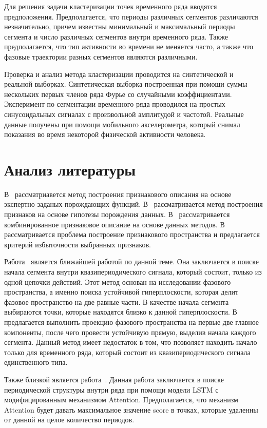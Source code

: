 \documentclass[12pt, twoside]{article}
\numberwithin{equation}{section}
\begin{document}
Для решения задачи кластеризации точек временного ряда вводятся предположения. 
Предполагается, что периоды различных сегментов различаются незначительно, причем известны минимальный и максимальный периоды сегмента и число различных сегментов внутри временного ряда. 
Также предполагается, что тип активности во времени не меняется часто, а также что фазовые траектории разных сегментов являются различными. 

Проверка и анализ метода кластеризации проводится на синтетической и реальной выборках. 
Синтетическая выборка построенная при помощи суммы нескольких первых членов ряда Фурье со случайными коэффициентами. 
Эксперимент по сегментации временного ряда проводился на простых синусоидальных сигналах с произвольной амплитудой и частотой. 
Реальные данные получены при помощи мобильного акселерометра, который снимал показания во время некоторой физической активности человека. 

\section{Анализ литературы}
В~\cite{kwapisz2010} рассматриавется метод построения признакового описания на основе экспертно заданых порождающих функций.
В~\cite{lukashin2003} рассматривается метод построения признаков на основе гипотезы порождения данных. 
В~\cite{Ivkin2015} рассматривается комбинированное признаковое описание на основе данных методов. 
В~\cite{Katrutsa2015} рассматривается проблема построение признакового пространства и предлагается критерий избыточности выбранных признаков.

Работа~\cite{motrenko2015} является ближайшей работой по данной теме. Она заключается в поиске начала сегмента внутри квазипериодического сигнала, который состоит, только из одной цепочки действий. Этот метод основан на исследовании фазового пространства, а именно поиска устойчивой гиперплоскости, которая делит фазовое пространство на две равные части. В качестве начала сегмента выбираются точки, которые находятся близко к данной гиперплоскости. В~\cite{motrenko2015} предлагается выполнить проекцию фазового пространства на первые две главное компоненты, после чего провести устойчивую прямую, выделив начала каждого сегмента. 
Данный метод имеет недостаток в том, что позволяет находить начало только для временного ряда, который состоит из квазипериодического сигнала единственного типа.


Также близкой является работа~\cite{cinar2018}.  Данная работа заключается в поиске периодической структуры внутри ряда при помощи модели LSTM с модифицированным механизмом Attention. Предполагается, что механизм Attention будет давать максимальное значение score в точках, которые удаленны от данной на целое количество периодов.
\end{document}
